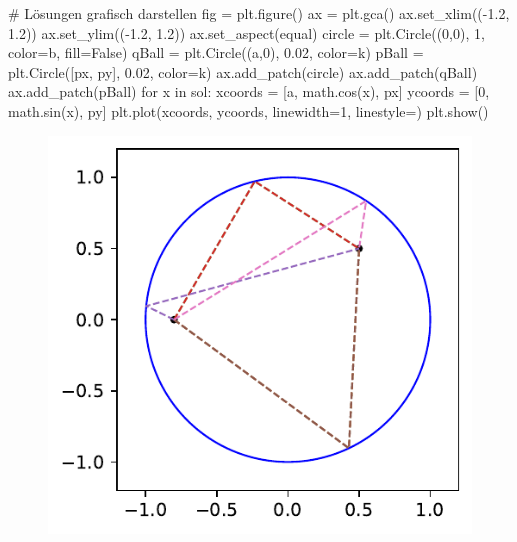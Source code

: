 \documentclass[
  letterpaper,
  DIV=11,
  oneside]{scrreprt}
\newenvironment{Shaded}{\begin{snugshade}}{\end{snugshade}}
\newcommand{\CommentTok}[1]{\textcolor[rgb]{0.37,0.37,0.37}{#1}}
\newcommand{\ControlFlowTok}[1]{\textcolor[rgb]{0.00,0.23,0.31}{#1}}
\newcommand{\DecValTok}[1]{\textcolor[rgb]{0.68,0.00,0.00}{#1}}
\newcommand{\FloatTok}[1]{\textcolor[rgb]{0.68,0.00,0.00}{#1}}
\newcommand{\KeywordTok}[1]{\textcolor[rgb]{0.00,0.23,0.31}{#1}}
\newcommand{\NormalTok}[1]{\textcolor[rgb]{0.00,0.23,0.31}{#1}}
\newcommand{\OperatorTok}[1]{\textcolor[rgb]{0.37,0.37,0.37}{#1}}
\newcommand{\StringTok}[1]{\textcolor[rgb]{0.13,0.47,0.30}{#1}}
\newcommand{\VariableTok}[1]{\textcolor[rgb]{0.07,0.07,0.07}{#1}}
\theoremstyle{definition}
\theoremstyle{definition}
\theoremstyle{remark}
\begin{document}
\begin{tcolorbox}
\begin{Shaded}
\begin{Highlighting}[]
    \CommentTok{\# Lösungen grafisch darstellen}
\NormalTok{    fig }\OperatorTok{=}\NormalTok{ plt.figure()}
\NormalTok{    ax }\OperatorTok{=}\NormalTok{ plt.gca()}
\NormalTok{    ax.set\_xlim((}\OperatorTok{{-}}\FloatTok{1.2}\NormalTok{, }\FloatTok{1.2}\NormalTok{))}
\NormalTok{    ax.set\_ylim((}\OperatorTok{{-}}\FloatTok{1.2}\NormalTok{, }\FloatTok{1.2}\NormalTok{))}
\NormalTok{    ax.set\_aspect(}\StringTok{\textquotesingle{}equal\textquotesingle{}}\NormalTok{)}
\NormalTok{    circle }\OperatorTok{=}\NormalTok{ plt.Circle((}\DecValTok{0}\NormalTok{,}\DecValTok{0}\NormalTok{), }\DecValTok{1}\NormalTok{, color}\OperatorTok{=}\StringTok{\textquotesingle{}b\textquotesingle{}}\NormalTok{, fill}\OperatorTok{=}\VariableTok{False}\NormalTok{)}
\NormalTok{    qBall }\OperatorTok{=}\NormalTok{ plt.Circle((a,}\DecValTok{0}\NormalTok{), }\FloatTok{0.02}\NormalTok{, color}\OperatorTok{=}\StringTok{\textquotesingle{}k\textquotesingle{}}\NormalTok{)}
\NormalTok{    pBall }\OperatorTok{=}\NormalTok{ plt.Circle([px, py], }\FloatTok{0.02}\NormalTok{, color}\OperatorTok{=}\StringTok{\textquotesingle{}k\textquotesingle{}}\NormalTok{)}
\NormalTok{    ax.add\_patch(circle)}
\NormalTok{    ax.add\_patch(qBall)}
\NormalTok{    ax.add\_patch(pBall)}
    \ControlFlowTok{for}\NormalTok{ x }\KeywordTok{in}\NormalTok{ sol:}
\NormalTok{        xcoords }\OperatorTok{=}\NormalTok{ [a, math.cos(x), px]}
\NormalTok{        ycoords }\OperatorTok{=}\NormalTok{ [}\DecValTok{0}\NormalTok{, math.sin(x), py]}
\NormalTok{        plt.plot(xcoords, ycoords, linewidth}\OperatorTok{=}\DecValTok{1}\NormalTok{, linestyle}\OperatorTok{=}\StringTok{\textquotesingle{}{-}{-}\textquotesingle{}}\NormalTok{)}
\NormalTok{    plt.show()}
\end{Highlighting}
\end{Shaded}

\begin{figure}[H]

{\centering \includegraphics{./ADOneDimManually_files/figure-pdf/fig-billardproblemsolution-output-1.pdf}

}
\end{figure}
\end{tcolorbox}
\end{document}
